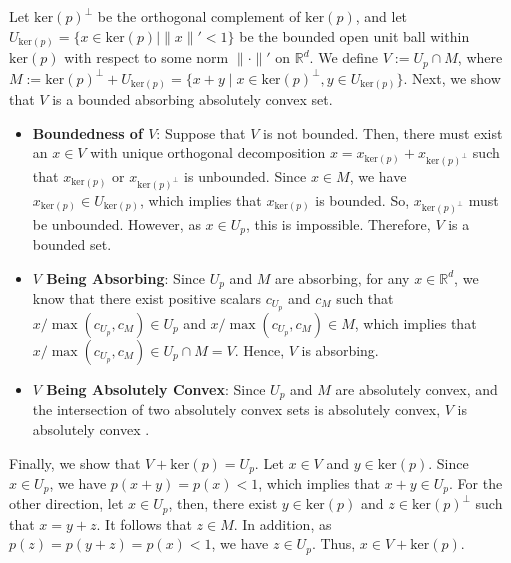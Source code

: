 \documentclass[11 pt]{article}
\begin{document}
\begin{enumerate}[(1)]
		
		Let $\text{ker}(p)^{\bot}$ be the orthogonal complement of $\text{ker}(p)$, and let $U_{\text{ker}(p)}=\{x \in \text{ker}(p) \mid \| x \|' < 1\}$ be the bounded open unit ball within $\text{ker}(p)$ with respect to some norm $\| \cdot \|'$ on $\mathbb{R}^d$. We define $V:= U_p \cap M$, where $M:= \text{ker}(p)^{\bot} + U_{\text{ker}(p)} = \{x+y \mid x \in \text{ker}(p)^{\bot}, y \in U_{\text{ker}(p)}\}$. Next, we show that $V$ is a bounded absorbing absolutely convex set.
		\begin{itemize}
			\item \textbf{Boundedness of $V$}: Suppose that $V$ is not bounded. Then, there must exist an $x \in V$ with unique orthogonal decomposition $x=x_{\text{ker}(p)} + x_{\text{ker}(p)^\bot}$ such that $x_{\text{ker}(p)}$ or $x_{\text{ker}(p)^\bot}$ is unbounded. Since $x \in M$, we have $x_{\text{ker}(p)} \in U_{\text{ker}(p)}$, which implies that $x_{\text{ker}(p)}$ is bounded. So, $x_{\text{ker}(p)^\bot}$ must be unbounded. However, as $x \in U_p$, this is impossible. Therefore, $V$ is a bounded set. 
			\item \textbf{$V$ Being Absorbing}: Since $U_p$ and $M$ are absorbing, for any $x \in \mathbb{R}^d$, we know that there exist positive scalars $c_{U_p}$ and $c_{M}$ such that $x/\max (c_{U_p}, c_M) \in U_p$ and $x/\max (c_{U_p}, c_M) \in M$, which implies that $x/\max (c_{U_p}, c_M) \in U_p \cap M =V$. Hence, $V$ is absorbing. 
			\item \textbf{$V$ Being Absolutely Convex}: Since $U_{p}$ and $M$ are absolutely convex, and the intersection of two absolutely convex sets is absolutely convex, $V$ is absolutely convex \cite{narici2010topological}. 
		\end{itemize}
		
		
		
		
		
		
		
		Finally, we show that $V + \text{ker}(p) = U_p$. Let $x \in V$ and $y \in \text{ker}(p)$. Since $x \in U_p$, we have $p(x+y) = p(x) < 1$, which implies that $x+y \in U_p$. For the other direction, let $x \in U_p$, then, there exist $y \in \text{ker}(p)$ and $z \in \text{ker}(p)^\bot$ such that $x = y + z$. It follows that $z \in M$. In addition, as $p(z) = p(y + z) = p(x) < 1$, we have $z \in U_p$. Thus, $x \in V + \text{ker}(p)$.  
		

\end{enumerate}
\end{document}
